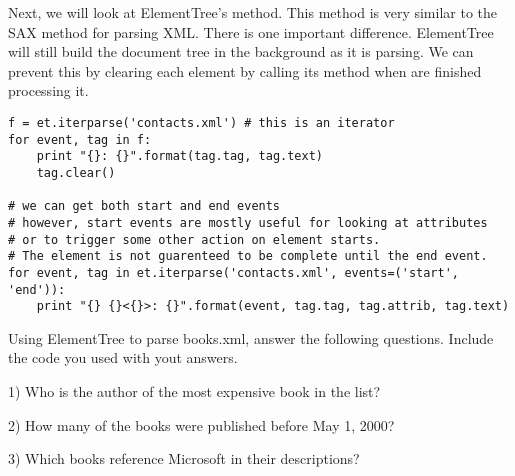 Next, we will look at ElementTree's  method.
This method is very similar to the SAX method for parsing XML.
There is one important difference.
ElementTree will still build the document tree in the background as it is parsing.
We can prevent this by clearing each element by calling its  method when are finished processing it.
\begin{lstlisting}
f = et.iterparse('contacts.xml') # this is an iterator
for event, tag in f:
    print "{}: {}".format(tag.tag, tag.text)
    tag.clear()
    
# we can get both start and end events
# however, start events are mostly useful for looking at attributes
# or to trigger some other action on element starts.
# The element is not guarenteed to be complete until the end event.
for event, tag in et.iterparse('contacts.xml', events=('start', 'end')):
    print "{} {}<{}>: {}".format(event, tag.tag, tag.attrib, tag.text)
\end{lstlisting}

\begin{problem}
Using ElementTree to parse books.xml, answer the following questions. Include the code you used with yout answers.

1) Who is the author of the most expensive book in the list?

2) How many of the books were published before May 1, 2000?

3) Which books reference Microsoft in their descriptions?
\end{problem}
